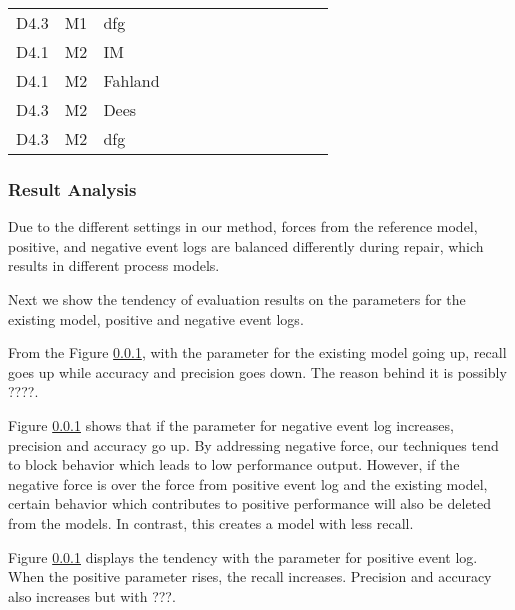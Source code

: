 \begin{table}[]
{\begin{tabular}{lll|llllllll|ll}
			D4.3      & M1              & dfg       &     &    &     &     &        &           &          &      &                   &                     \\
			D4.1      & M2              & IM  &     &    &     &     &        &           &          &      &                   &                     \\
			D4.1      & M2              & Fahland   &     &    &     &     &        &           &          &      &                   &                     \\
			D4.3      & M2              & Dees      &     &    &     &     &        &           &          &      &                   &                     \\
			D4.3      & M2              & dfg       &     &    &     &     &        &           &          &      &                   &      
			\\ \hline              
		\end{tabular}}
	
	\end{table}
\subsubsection{Result Analysis}
Due to the different settings in our method, forces from the reference model, positive, and negative event logs are balanced differently during repair, which results in different process models. 


Next we show the tendency of evaluation results on the parameters for the existing model, positive and negative event logs. 

From the Figure \ref{}, with the parameter for the existing model going up, recall goes up while accuracy and precision goes down. The reason behind it is possibly ????.

Figure \ref{} shows that if the parameter for negative event log increases, precision and accuracy go up. By addressing negative force, our techniques tend to block behavior which leads to low performance output. However, if the negative force is over the force from positive event log and the existing model, certain behavior which contributes to positive performance will also be deleted from the models. In contrast, this creates a model with less recall. 

Figure \ref{} displays the tendency with the parameter for positive event log. When the positive parameter rises, the recall increases. Precision and accuracy also increases but with ???.